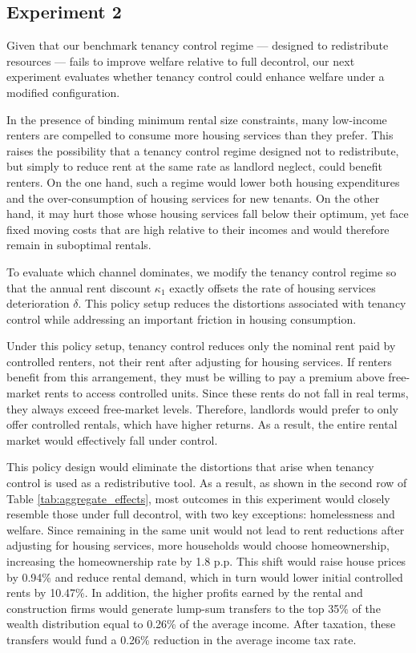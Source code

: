 \documentclass[parskip=full]{article}
\begin{document}
\subsection{Experiment 2}\label{sec:exp_2}

Given that our benchmark tenancy control regime — designed to redistribute resources — fails to improve welfare relative to full decontrol, our next experiment evaluates whether tenancy control could enhance welfare under a modified configuration.

In the presence of binding minimum rental size constraints, many low-income renters are compelled to consume more housing services than they prefer. This raises the possibility that a tenancy control regime designed not to redistribute, but simply to reduce rent at the same rate as landlord neglect, could benefit renters. On the one hand, such a regime would lower both housing expenditures and the over-consumption of housing services for new tenants. On the other hand, it may hurt those whose housing services fall below their optimum, yet face fixed moving costs that are high relative to their incomes and would therefore remain in suboptimal rentals.

To evaluate which channel dominates, we modify the tenancy control regime so that the annual rent discount $\kappa_1$ exactly offsets the rate of housing services deterioration $\delta$. This policy setup reduces the distortions associated with tenancy control while addressing an important friction in housing consumption. 

Under this policy setup, tenancy control reduces only the nominal rent paid by controlled renters, not their rent after adjusting for housing services. If renters benefit from this arrangement, they must be willing to pay a premium above free-market rents to access controlled units. Since these rents do not fall in real terms, they always exceed free-market levels. Therefore, landlords would prefer to only offer controlled rentals, which have higher returns. As a result, the entire rental market would effectively fall under control.

This policy design would eliminate the distortions that arise when tenancy control is used as a redistributive tool. As a result, as shown in the second row of Table \ref{tab:aggregate_effects}, most outcomes in this experiment would closely resemble those under full decontrol, with two key exceptions: homelessness and welfare. Since remaining in the same unit would not lead to rent reductions after adjusting for housing services, more households would choose homeownership, increasing the homeownership rate by 1.8 p.p. This shift would raise house prices by 0.94\% and reduce rental demand, which in turn would lower initial controlled rents by 10.47\%. In addition, the higher profits earned by the rental and construction firms would generate lump-sum transfers to the top 35\% of the wealth distribution equal to 0.26\% of the average income. After taxation, these transfers would fund a 0.26\% reduction in the average income tax rate.
\end{document}
